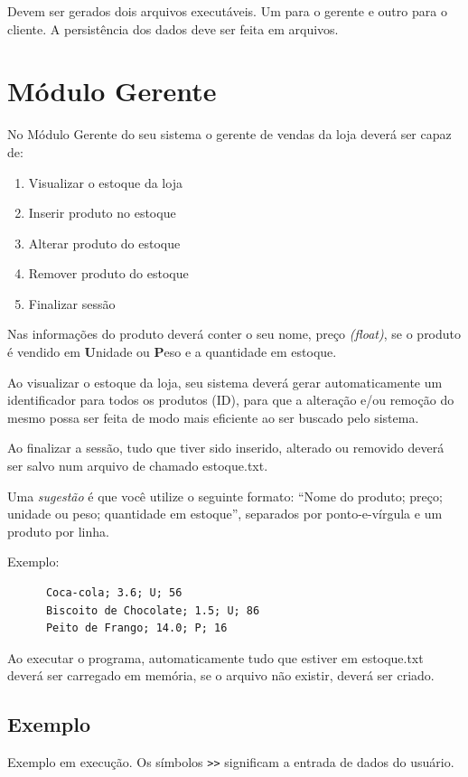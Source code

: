 \documentclass[12pt]{article}
\begin{document}
Devem ser gerados dois arquivos executáveis. Um para o gerente e outro para o cliente. A persistência dos dados deve ser feita em arquivos.

\section{Módulo Gerente}
No Módulo Gerente do seu sistema o gerente de vendas da loja deverá ser capaz de:

\begin{enumerate}
  \item Visualizar o estoque da loja
  \item Inserir produto no estoque
  \item Alterar produto do estoque
  \item Remover produto do estoque
  \item Finalizar sessão
\end{enumerate}

Nas informações do produto deverá conter o seu nome, preço \textit{(float)}, se o produto é vendido em \textbf{U}nidade ou \textbf{P}eso e a quantidade em estoque. 

Ao visualizar o estoque da loja, seu sistema deverá gerar automaticamente um identificador para todos os produtos (ID), para que a alteração e/ou remoção do mesmo possa ser feita de modo mais eficiente ao ser buscado pelo sistema.

Ao finalizar a sessão, tudo que tiver sido inserido, alterado ou removido deverá ser salvo num arquivo de chamado estoque.txt.

Uma {\it sugestão} é que você utilize o seguinte formato:
“Nome do produto; preço; unidade ou peso; quantidade em estoque”, separados por ponto-e-vírgula e um produto por linha.

Exemplo:

\begin{verbatim}
	  Coca-cola; 3.6; U; 56
	  Biscoito de Chocolate; 1.5; U; 86
	  Peito de Frango; 14.0; P; 16
\end{verbatim}

Ao executar o programa, automaticamente tudo que estiver em estoque.txt deverá ser carregado em memória, se o arquivo não existir, deverá ser criado.

\subsection{Exemplo}
Exemplo em execução. Os símbolos \verb|>>| significam a entrada de dados do usuário.
\end{document}
